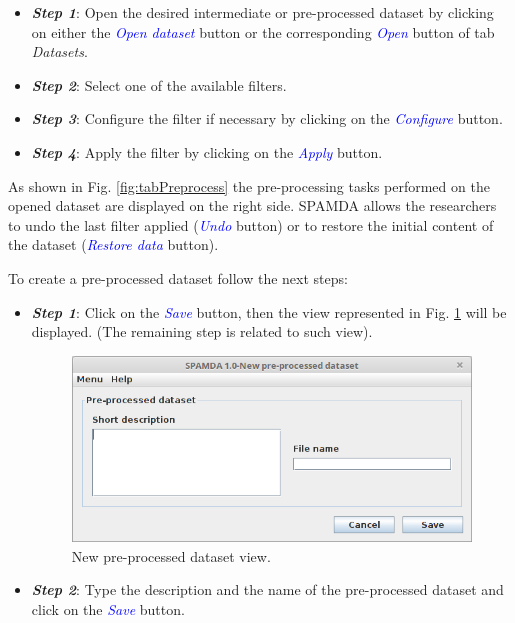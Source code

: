 \begin{onehalfspace}
					\begin{itemize}
						\item \textit{\textbf{Step 1}}: Open the desired intermediate or pre-processed dataset by clicking on either the \textcolor{blue}{\textit{Open dataset}} button or the corresponding \textcolor{blue}{\textit{Open}} button of tab \textit{Datasets}.
						\item \textit{\textbf{Step 2}}: Select one of the available filters.
						\item \textit{\textbf{Step 3}}: Configure the filter if necessary by clicking on the \textcolor{blue}{\textit{Configure}} button.
						\item \textit{\textbf{Step 4}}: Apply the filter by clicking on the \textcolor{blue}{\textit{Apply}} button.
					\end{itemize}
					
				As shown in Fig. \ref{fig:tabPreprocess} the pre-processing tasks performed on the opened dataset are displayed on the right side. SPAMDA allows the researchers to undo the last filter applied (\textcolor{blue}{\textit{Undo}} button) or to restore the initial content of the dataset (\textcolor{blue}{\textit{Restore data}} button).
				
				To create a pre-processed dataset follow the next steps:
				
					\begin{itemize}
						\item \textit{\textbf{Step 1}}: Click on the \textcolor{blue}{\textit{Save}} button, then the view represented in Fig. \ref{fig:creatingPreProcessedDataset} will be displayed. (The remaining step is related to such view).
							\begin{figure}[ht!]
								\centering
								\includegraphics[scale=0.40]{figures/creatingPreProcessedDataset.png}
								\caption{New pre-processed dataset view.}
								\label{fig:creatingPreProcessedDataset}
							\end{figure}
						\item \textit{\textbf{Step 2}}: Type the description and the name of the pre-processed dataset and click on the \textcolor{blue}{\textit{Save}} button.
					\end{itemize}
					

\end{onehalfspace}
